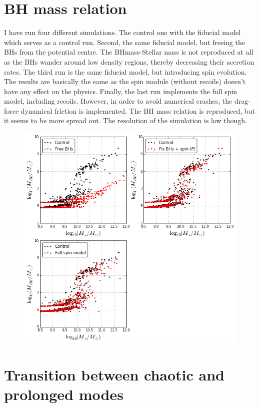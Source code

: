 \documentclass[a4,useAMS,usenatbib,usegraphicx,12pt]{article}
\begin{document}
\section{BH mass relation}

I have run four different simulations. The control one with the fiducial model which serves as a control
run. Second, the same fiducial model, but freeing the BHs from the potential centre. The BHmass-Stellar mass
is not reproduced at all as the BHs wander around low density regions, thereby decreasing their accretion 
rates. The third run is the same fiducial model, but introducing spin evolution. The results are basically 
the same as the spin module (without recoils) doesn't have any effect on the physics. Finally, the last run
implements the full spin model, including recoils. However, in order to avoid numerical crashes, the drag-force
dynamical friction is implemented. The BH mass relation is reproduced, but it seems to be more spread out. 
The resolution of the simulation is low though.

\begin{figure}[htbp]
\centering
\includegraphics[width=.8\textwidth]{./figures/BHmassRelation.png}
\end{figure}


\section{Transition between chaotic and prolonged modes}
\end{document}

